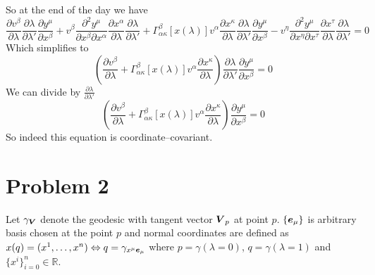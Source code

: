 %
So at the end of the day we have
%
\begin{equation}
    \frac{\partial v^\beta}{\partial\lambda}
    \frac{\partial \lambda}{\partial \lambda'}
    \frac{\partial y^\mu}{\partial x^\beta} +
    v^\beta\frac{\partial^2 y^\mu}{\partial x^\beta \partial x^\alpha}
    \frac{\partial x^\alpha}{\partial \lambda}
    \frac{\partial \lambda}{\partial \lambda'}+
    \Gamma_{\alpha\kappa}^\beta\left[x(\lambda)\right]v^\alpha
    \frac{\partial x^\kappa}{\partial \lambda}
    \frac{\partial \lambda}{\partial \lambda'}
    \frac{\partial y^\mu}{\partial x^\beta}-
    v^\eta\frac{\partial^2 y^\mu}{\partial x^\eta \partial x^\tau}
    \frac{\partial x^\tau}{\partial \lambda}
    \frac{\partial \lambda}{\partial \lambda'} = 0
\end{equation}
%
Which simplifies to
%
\begin{equation}
    \left(\frac{\partial v^\beta}{\partial\lambda} +
    \Gamma_{\alpha\kappa}^\beta\left[x(\lambda)\right]v^\alpha
    \frac{\partial x^\kappa}{\partial \lambda}\right)    
    \frac{\partial \lambda}{\partial \lambda'}
    \frac{\partial y^\mu}{\partial x^\beta} = 0
\end{equation}
%
We can divide by $\frac{\partial \lambda}{\partial \lambda'}$
%
\begin{equation}
    \boxed{\left(\frac{\partial v^\beta}{\partial\lambda} +
        \Gamma_{\alpha\kappa}^\beta\left[x(\lambda)\right]v^\alpha
        \frac{\partial x^\kappa}{\partial \lambda}\right)
        \frac{\partial y^\mu}{\partial x^\beta} = 0}
\end{equation}
%
So indeed this equation is coordinate--covariant.

\section*{Problem 2}

Let $\gamma_{\boldsymbol{V}}$ denote the geodesic with tangent vector $\boldsymbol{V}_p$ at
point $p$. $\{\boldsymbol{e}_\mu\}$ is arbitrary basis chosen at the point $p$ and normal
coordinates are defined as $x(q)=(x^1,\dots,x^n) \Leftrightarrow q=\gamma_{x^\mu
        \boldsymbol{e}_\mu}$ where $p=\gamma(\lambda=0)$, $q=\gamma(\lambda=1)$ and $\{x^i\}_{i=0}^n \in \mathbb{R}$.

